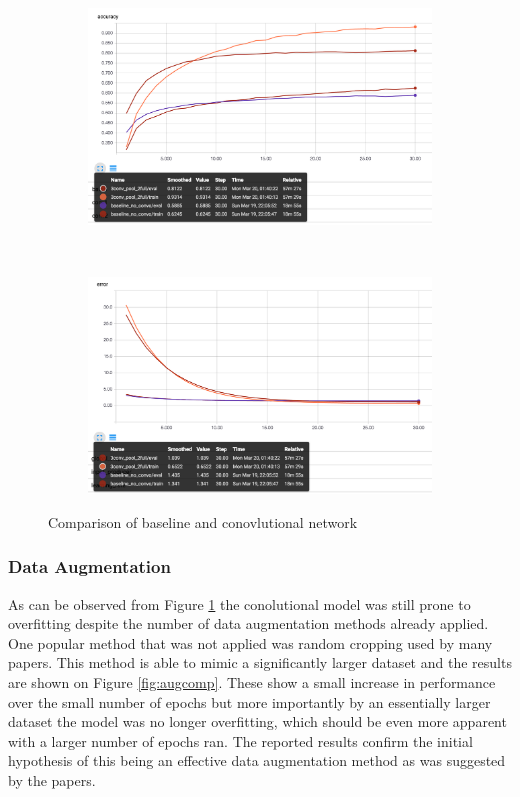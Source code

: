 \documentclass[12pt]{article}
\begin{document}
\begin{figure}[ht!]
    \centering
    \begin{subfigure}[t]{0.475\textwidth}
        \centering
        \includegraphics[width=1.0\linewidth]{netcompa.png}
    \end{subfigure}%
    ~ 
    \begin{subfigure}[t]{0.475\textwidth}
        \centering
        \includegraphics[width=1.0\linewidth]{netcompe.png}
    \end{subfigure}
    \caption{Comparison of baseline and conovlutional network}
    \label{fig:netcomp}
\end{figure}

\subsubsection*{Data Augmentation}

As can be observed from Figure \ref{fig:netcomp} the conolutional model was still prone to overfitting despite the number of data augmentation methods already applied. One popular method that was not applied was random cropping used by many papers\cite{kernel}\cite{crop}. This method is able to mimic a significantly larger dataset and the results are shown on Figure \ref{fig:augcomp}. These show a small increase in performance over the small number of epochs but more importantly by an essentially larger dataset the model was no longer overfitting, which should be even more apparent with a larger number of epochs ran. The reported results confirm the initial hypothesis of this being an effective data augmentation method as was suggested by the papers.
\end{document}
